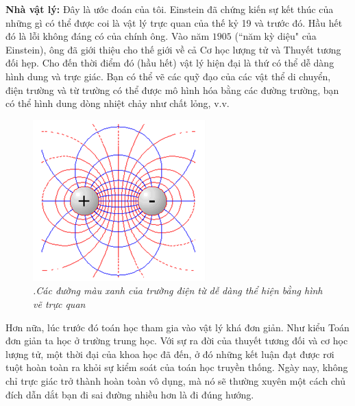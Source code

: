 \begin{multicols}{2}
	\vskip 0.1cm
	\textbf{\color{quantoan}Nhà vật lý:} Đây là ước  đoán của tôi. Einstein đã chứng kiến sự kết thúc của những gì có thể được coi là vật lý trực quan của thế kỷ 19 và trước đó. Hầu hết đó là lỗi không đáng có của chính  ông. Vào năm $1905$ (``năm kỳ diệu" của Einstein), ông đã giới thiệu cho thế giới về cả Cơ học lượng tử và Thuyết tương đối hẹp. Cho đến thời điểm đó (hầu hết) vật lý hiện đại là thứ có thể dễ dàng hình dung và trực giác. Bạn có thể vẽ các quỹ đạo của các vật thể di chuyển, điện trường và từ trường có thể được mô hình hóa bằng các đường trường, bạn có thể hình dung dòng nhiệt chảy như chất lỏng, v.v.
	\begin{figure}[H]
		\vspace*{-5pt}
		\centering
		\captionsetup{labelformat= empty, justification=centering}
		\includegraphics[width= 0.95\linewidth]{1}
		\caption{\small\textit{\color{quantoan}.Các đường màu xanh của trường điện từ dễ dàng thể hiện bằng hình vẽ trực quan}}
		\vspace*{-10pt}
	\end{figure}
	Hơn nữa, lúc trước đó toán học tham gia vào vật lý  khá đơn giản. Như kiểu Toán đơn giản ta học ở  trường trung học. Với sự ra đời của thuyết tương đối và cơ học lượng tử, một thời đại của khoa học đã đến, ở đó những kết luận đạt được rơi tuột hoàn toàn ra khỏi sự kiểm soát của toán học truyền thống. Ngày nay, không chỉ trực giác trở thành hoàn toàn vô dụng, mà nó sẽ thường xuyên một cách chủ đích dẫn dắt bạn đi sai đường nhiều hơn là đi đúng hướng.

\end{multicols}
